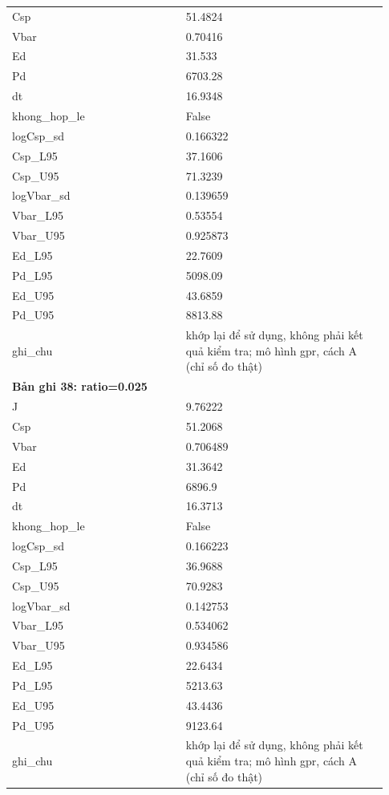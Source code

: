 \begin{longtable}{p{0.43\linewidth}p{0.50\linewidth}}
Csp & 51.4824 \\
Vbar & 0.70416 \\
Ed & 31.533 \\
Pd & 6703.28 \\
dt & 16.9348 \\
khong\_\allowbreak hop\_\allowbreak le & False \\
logCsp\_\allowbreak sd & 0.166322 \\
Csp\_\allowbreak L95 & 37.1606 \\
Csp\_\allowbreak U95 & 71.3239 \\
logVbar\_\allowbreak sd & 0.139659 \\
Vbar\_\allowbreak L95 & 0.53554 \\
Vbar\_\allowbreak U95 & 0.925873 \\
Ed\_\allowbreak L95 & 22.7609 \\
Pd\_\allowbreak L95 & 5098.09 \\
Ed\_\allowbreak U95 & 43.6859 \\
Pd\_\allowbreak U95 & 8813.88 \\
ghi\_\allowbreak chu & khớp lại để sử dụng, không phải kết quả kiểm tra; mô hình gpr, cách A (chỉ số đo thật) \\
\midrule
\multicolumn{2}{p{0.95\linewidth}}{\textbf{Bản ghi 38: ratio=0.025}} \\
J & 9.76222 \\
Csp & 51.2068 \\
Vbar & 0.706489 \\
Ed & 31.3642 \\
Pd & 6896.9 \\
dt & 16.3713 \\
khong\_\allowbreak hop\_\allowbreak le & False \\
logCsp\_\allowbreak sd & 0.166223 \\
Csp\_\allowbreak L95 & 36.9688 \\
Csp\_\allowbreak U95 & 70.9283 \\
logVbar\_\allowbreak sd & 0.142753 \\
Vbar\_\allowbreak L95 & 0.534062 \\
Vbar\_\allowbreak U95 & 0.934586 \\
Ed\_\allowbreak L95 & 22.6434 \\
Pd\_\allowbreak L95 & 5213.63 \\
Ed\_\allowbreak U95 & 43.4436 \\
Pd\_\allowbreak U95 & 9123.64 \\
ghi\_\allowbreak chu & khớp lại để sử dụng, không phải kết quả kiểm tra; mô hình gpr, cách A (chỉ số đo thật) \\

\end{longtable}
